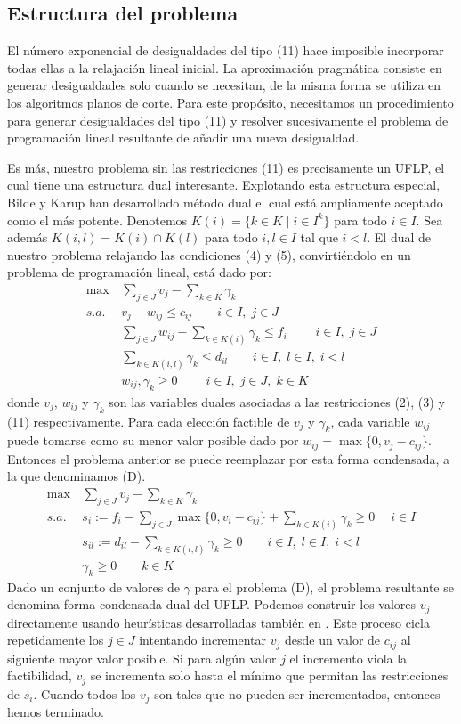 \documentclass[twoside,12pt]{article}
\begin{document}
\subsection{Estructura del problema}
El número exponencial de desigualdades del tipo (11) hace imposible incorporar todas ellas a la relajación lineal inicial. La aproximación pragmática consiste en generar desigualdades solo cuando se necesitan, de la misma forma se utiliza en los algoritmos planos de corte. Para este propósito, necesitamos un procedimiento para generar desigualdades del tipo (11) y resolver sucesivamente el problema de programación lineal resultante de añadir una nueva desigualdad.

Es más, nuestro problema sin las restricciones (11) es precisamente un UFLP, el cual tiene una estructura dual interesante. Explotando esta estructura especial, Bilde y Karup \cite{bilde} han desarrollado método dual el cual está ampliamente aceptado como el más potente. Denotemos $K(i) = \{k \in K \mid i \in I^k\}$ para todo $i\in I$. Sea además $K(i,l) = K(i)\cap K(l)$ para todo $i,l \in I$ tal que $i<l$. El dual de nuestro problema relajando las condiciones (4) y (5), convirtiéndolo en un problema de programación lineal, está dado por:
\begin{align*}
\max \,& \sum_{j\in J} v_j - \sum_{k\in K} \gamma_k \\
s.a.\,& v_j - w_{ij} \leq c_{ij} \qquad  i\in I,\;j \in J\\
& \sum_{j\in J} w_{ij} - \sum_{k\in K(i)} \gamma_k \leq f_i \;\qquad i \in I,\; j\in J\\
&\sum_{k\in K(i,l)} \gamma_k \leq d_{il} \qquad i \in I,\; l\in I,\; i<l\\
&w_{ij},\gamma_k \geq 0 \qquad \;i\in I,\; j\in J,\; k\in K
\end{align*}
donde $v_j$, $w_{ij}$ y $\gamma_k$ son las variables duales asociadas a las restricciones (2), (3) y (11) respectivamente. Para cada elección factible de $v_j$ y $\gamma_k$, cada variable $w_{ij}$ puede tomarse como su menor valor posible dado por $w_{ij} = \max\{0,v_j-c_{ij}\}$. Entonces el problema anterior se puede reemplazar por esta forma condensada, a la que denominamos (D).
 \begin{align*}
\max \,& \sum_{j\in J} v_j - \sum_{k\in K} \gamma_k \\
s.a.\,& s_i:= f_i -\sum_{j \in J} \max\{0,v_i-c_{ij}\} + \sum_{k \in K(i)} \gamma_k \geq 0 \;\quad  i \in I \\
& s_{il}:= d_{il} - \sum_{k\in K(i,l)} \gamma_k \geq 0 \qquad i \in I,\; l\in I,\; i<l\\
&\gamma_k \geq 0 \qquad  k\in K
\end{align*}
Dado un conjunto de valores de $\gamma$ para el problema (D), el problema resultante se denomina forma condensada dual del UFLP. Podemos construir los valores $v_j$ directamente usando heurísticas desarrolladas también en \cite{bilde}. Este proceso cicla repetidamente los $j\in J$ intentando incrementar $v_j$ desde un valor de $c_{ij}$ al siguiente mayor valor posible. Si para algún valor $j$ el incremento viola la factibilidad, $v_j$ se incrementa solo hasta el mínimo que permitan las restricciones de $s_i$. Cuando todos los $v_j$ son tales que no pueden ser incrementados, entonces hemos terminado.
\newpage
\end{document}
